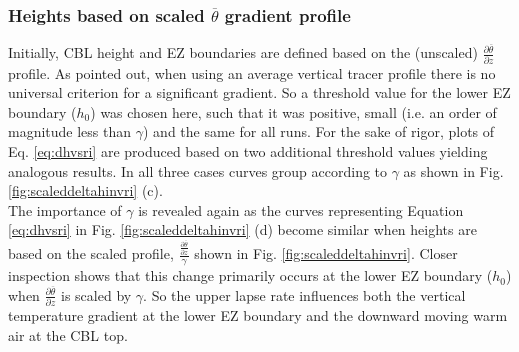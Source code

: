 \subsubsection{Heights based on scaled $\overline{\theta}$ gradient profile}

Initially, CBL height and EZ boundaries are defined based on the (unscaled) $\frac{\partial \overline{\theta}}{\partial z}$ profile.  As \cite{BrooksFowler2} pointed out, when using an average vertical tracer profile there is no universal criterion for a significant gradient.  So a threshold value for the lower EZ boundary ($h_{0}$) was chosen here, such that it was positive, small (i.e. an order of magnitude less than $\gamma$) and the same for all runs.  For the sake of rigor, plots of Eq. \ref{eq:dhvsri}
are produced based on two additional threshold values yielding analogous results.  In all three cases curves group according to $\gamma$ as shown in Fig. \ref{fig:scaleddeltahinvri} (c).\\

The importance of $\gamma$ is revealed again as the curves representing Equation \ref{eq:dhvsri} in Fig. \ref{fig:scaleddeltahinvri} (d) become similar when heights are based on the scaled profile, $\frac{\frac{\partial \overline{\theta}}{\partial z}}{\gamma}$ shown in Fig. \ref{fig:scaleddeltahinvri}. Closer inspection shows that this change primarily occurs at the lower EZ boundary ($h_{0}$) when $\frac{\partial \overline{\theta}}{\partial z}$ is scaled by $\gamma$. So the upper lapse rate influences both the vertical temperature gradient at the lower EZ boundary and the downward moving warm air at the CBL top.\\


